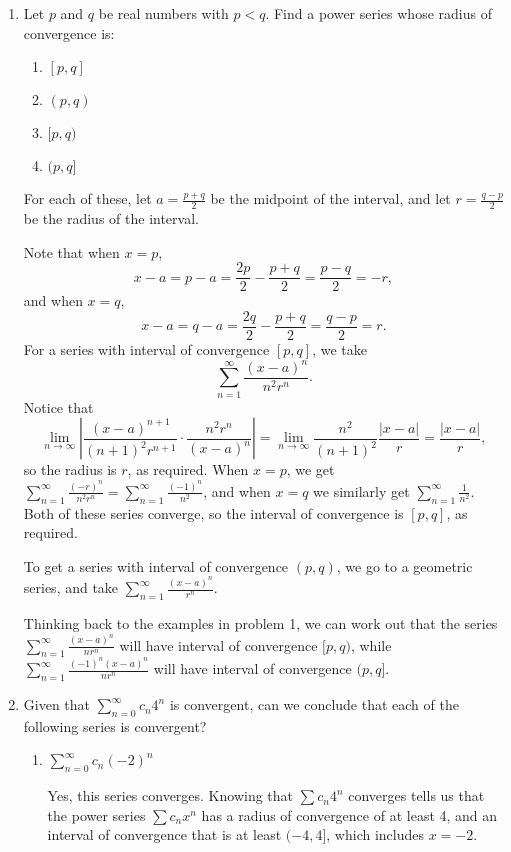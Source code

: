 \documentclass[12pt]{article}
\newcommand{\di}{\displaystyle}
\newcommand{\abs}[1]{\left\lvert #1\right\rvert}
\begin{document}
\begin{enumerate}
\begin{enumerate}
\end{enumerate}
\item Let $p$ and $q$ be real numbers with $p<q$. Find a power series whose radius of convergence is:
\begin{multicols}{4}
\begin{enumerate}
\item $[p,q]$
\item $(p,q)$
\item $[p,q)$
\item $(p,q]$
\end{enumerate}
\end{multicols}

For each of these, let $a=\frac{p+q}{2}$ be the midpoint of the interval, and let $r=\frac{q-p}{2}$ be the radius of the interval. 

Note that when $x=p$, 
\[
x-a = p-a = \frac{2p}{2}-\frac{p+q}{2} = \frac{p-q}{2} = -r,
\]
and when $x=q$,
\[
x-a = q-a = \frac{2q}{2}-\frac{p+q}{2} = \frac{q-p}{2} = r.
\]
For a series with interval of convergence $[p,q]$, we take
\[
\sum_{n=1}^\infty \frac{(x-a)^n}{n^2r^n}.
\]
Notice that
\[
\lim_{n\to\infty}\abs{\frac{(x-a)^{n+1}}{(n+1)^2r^{n+1}}\cdot \frac{n^2r^n}{(x-a)^n}} = \lim_{n\to\infty}\frac{n^2}{(n+1)^2}\frac{\abs{x-a}}{r} = \frac{\abs{x-a}}{r},
\]
so the radius is $r$, as required. When $x=p$, we get $\di\sum_{n=1}^\infty \frac{(-r)^n}{n^2r^n} = \sum_{n=1}^\infty\frac{(-1)^n}{n^2}$, and when $x=q$ we similarly get $\di\sum_{n=1}^\infty\frac{1}{n^2}$. Both of these series converge, so the interval of convergence is $[p,q]$, as required.

To get a series with interval of convergence $(p,q)$, we go to a geometric series, and take $\di\sum_{n=1}^\infty \frac{(x-a)^n}{r^n}$.

Thinking back to the examples in problem 1, we can work out that the series $\di\sum_{n=1}^\infty \frac{(x-a)^n}{nr^n}$ will have interval of convergence $[p,q)$, while $\di\sum_{n=1}^\infty \frac{(-1)^n(x-a)^n}{nr^n}$ will have interval of convergence $(p,q]$.

\item Given that $\sum_{n=0}^\infty c_n4^n$ is convergent, can we conclude that each of the following series is convergent?

\begin{enumerate}
\item $\di\sum_{n=0}^\infty c_n(-2)^n$

Yes, this series converges. Knowing that $\sum c_n4^n$ converges tells us that the power series $\sum c_nx^n$ has a radius of convergence of at least 4, and an interval of convergence that is at least $(-4,4]$, which includes $x=-2$.


\end{enumerate}
\end{enumerate}
\end{document}
